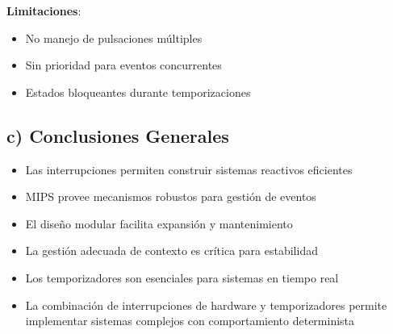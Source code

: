 \documentclass[12pt]{article}
\begin{document}
\textbf{Limitaciones}:
\begin{itemize}
    \item No manejo de pulsaciones múltiples
    \item Sin prioridad para eventos concurrentes
    \item Estados bloqueantes durante temporizaciones
\end{itemize}

\subsection*{c) Conclusiones Generales}
\begin{itemize}
    \item Las interrupciones permiten construir sistemas reactivos eficientes
    \item MIPS provee mecanismos robustos para gestión de eventos
    \item El diseño modular facilita expansión y mantenimiento
    \item La gestión adecuada de contexto es crítica para estabilidad
    \item Los temporizadores son esenciales para sistemas en tiempo real
    \item La combinación de interrupciones de hardware y temporizadores permite implementar sistemas complejos con comportamiento determinista
\end{itemize}
\end{document}
